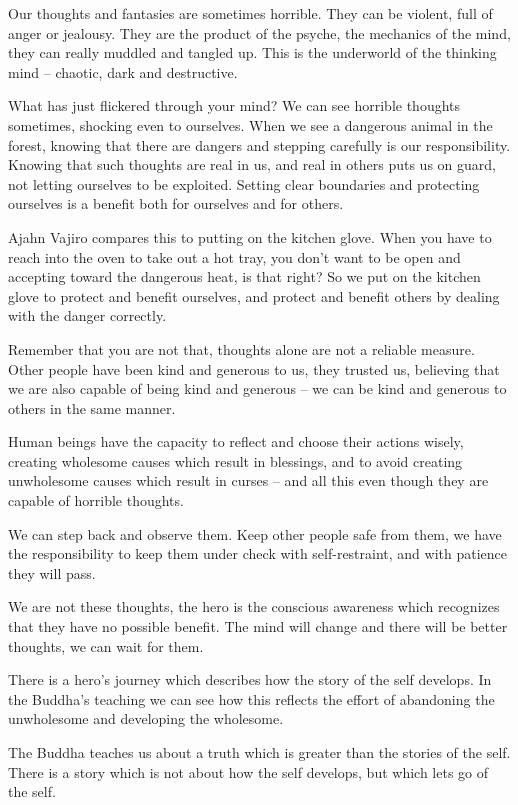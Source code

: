 Our thoughts and fantasies are sometimes horrible. They can be violent,
full of anger or jealousy. They are the product of the psyche, the
mechanics of the mind, they can really muddled and tangled up. This is
the underworld of the thinking mind -- chaotic, dark and destructive.

What has just flickered through your mind? We can see horrible thoughts
sometimes, shocking even to ourselves. When we see a dangerous animal in
the forest, knowing that there are dangers and stepping carefully is our
responsibility. Knowing that such thoughts are real in us, and real in
others puts us on guard, not letting ourselves to be exploited. Setting
clear boundaries and protecting ourselves is a benefit both for
ourselves and for others.

Ajahn Vajiro compares this to putting on the kitchen glove. When you
have to reach into the oven to take out a hot tray, you don't want to be
open and accepting toward the dangerous heat, is that right? So we put
on the kitchen glove to protect and benefit ourselves, and protect and
benefit others by dealing with the danger correctly.

Remember that you are not that, thoughts alone are not a reliable
measure. Other people have been kind and generous to us, they trusted
us, believing that we are also capable of being kind and generous -- we
can be kind and generous to others in the same manner.

Human beings have the capacity to reflect and choose their actions
wisely, creating wholesome causes which result in blessings, and to
avoid creating unwholesome causes which result in curses -- and all this
even though they are capable of horrible thoughts.

We can step back and observe them. Keep other people safe from them, we
have the responsibility to keep them under check with self-restraint,
and with patience they will pass.

We are not these thoughts, the hero is the conscious awareness which
recognizes that they have no possible benefit. The mind will change and
there will be better thoughts, we can wait for them.

There is a hero's journey which describes how the story of the self
develops. In the Buddha's teaching we can see how this reflects the
effort of abandoning the unwholesome and developing the wholesome.

The Buddha teaches us about a truth which is greater than the stories of
the self. There is a story which is not about how the self develops, but
which lets go of the self.

